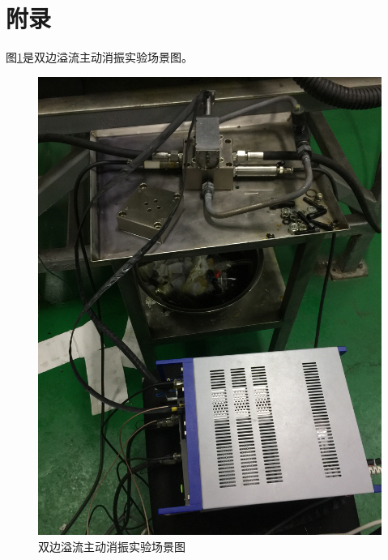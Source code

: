 \documentclass[12pt]{article}
\begin{document}
\section{附录}
图\ref{fig:fig15}是双边溢流主动消振实验场景图。
\begin{figure}[H]
\begin{center}
\includegraphics[width=0.9\linewidth]{./images/实验场景图.JPG}
\caption{双边溢流主动消振实验场景图}
\label{fig:fig15}
\end{center}
\end{figure}
\end{document}
